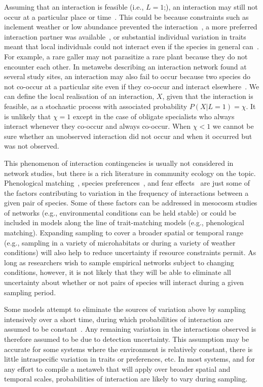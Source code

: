 \documentclass[12pt]{article}
\begin{document}
\begin{spacing}{2.0}
          Assuming that an interaction is feasible (i.e., $L=1$;), an interaction may still not occur at a particular place or time~\citep{Poisot2015,Graham2018}. This could be because constraints such as inclement weather or low abundance prevented the interaction~\citep{Jordano2016,Graham2018}, a more preferred interaction partner was available~\citep{Weinstein2017a}, or substantial individual variation in traits meant that local individuals could not interact even if the species in general can~\citep{Gravel2013,Wells2013,Poisot2015}. For example, a rare galler may not parasitize a rare plant because they do not encounter each other. In metawebs describing an interaction network found at several study sites, an interaction may also fail to occur because two species do not co-occur at a particular site even if they co-occur and interact elsewhere~\citep{}. We can define the local realisation of an interaction, $X$, given that the interaction is feasible, as a stochastic process with associated probability $P(X|L=1)=\chi$. It is unlikely that $\chi=1$  except in the case of obligate specialists who always interact whenever they co-occur and always co-occur. When $\chi<1$ we cannot be sure whether an unobserved interaction did not occur and when it occurred but was not observed.

          This phenomenon of interaction contingencies is usually not considered in network studies, but there is a rich literature in community ecology  on the topic. Phenological matching~\citep{MillerRushing2010,Gezon2016}, species preferences~\citep{Pires2011,Novak2015,Coux2016}, and fear effects~\citep{Luttbeg2005,Wirsing2008} are just some of the factors contributing to variation in the frequency of interactions between a given pair of species. Some of these factors can be addressed in mesocosm studies of networks (e.g., environmental conditions can be held stable) or could be included in models along the line of trait-matching models (e.g., phenological matching). Expanding sampling to cover a broader spatial or temporal range (e.g., sampling in a variety of microhabitats or during a variety of weather conditions) will also help to reduce uncertainty if resource constraints permit. As long as researchers wish to sample empirical networks subject to changing conditions, however, it is not likely that they will be able to eliminate all uncertainty about whether or not pairs of species will interact during a given sampling period.


          Some models attempt to eliminate the sources of variation above by sampling intensively over a short time, during which probabilities of interaction are assumed to be constant~\citep{Bartomeus2013,Weinstein2017,Weinstein2017a}. Any remaining variation in the interactions observed is therefore assumed to be due to detection uncertainty. This assumption may be accurate for some systems where the environment is relatively constant, there is little intraspecific variation in traits or preferences, etc. In most systems, and for any effort to compile a metaweb that will apply over broader spatial and temporal scales, probabilities of interaction are likely to vary during sampling.


\end{spacing}
\end{document}
